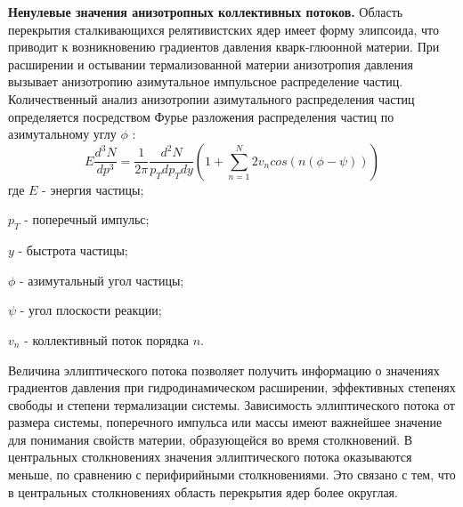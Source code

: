 

\textbf{Ненулевые значения анизотропных коллективных потоков.}
Область перекрытия сталкивающихся релятивистских ядер имеет форму элипсоида, что приводит к возникновению градиентов давления кварк-глюонной материи. При расширении и остывании термализованной материи анизотропия давления вызывает анизотропию азимутальное импульсное распределение частиц. Количественный анализ анизотропии азимутального распределения частиц определяется посредством Фурье разложения распределения частиц по азимутальному углу $\phi$ \cite{QGP_signatures}:
$$ E \frac{d^3N}{dp^3} = \frac{1}{2\pi} \frac{d^2N}{p_T dp_T dy} 
(1+\sum_{n=1}^{N} 2v_n cos(n(\phi - \psi)))$$
где $E$ - энергия частицы;
 
$p_T$ - поперечный импульс;

$y$ - быстрота частицы;

$\phi$ - азимутальный угол частицы;
 
$\psi$ - угол плоскости реакции;

$v_n$ - коллективный поток порядка $n$. 

Величина эллиптического потока позволяет получить информацию о значениях градиентов давления при гидродинамическом расширении, эффективных степенях свободы и степени термализации системы. Зависимость эллиптического потока от размера системы, поперечного импульса или массы имеют важнейшее значение для понимания свойств материи, образующейся во время столкновений. 
В центральных столкновениях значения эллиптического потока оказываются меньше, по сравнению с перифирийными столкновениями. Это связано с тем, что в центральных столкновениях область перекрытия ядер более округлая.

